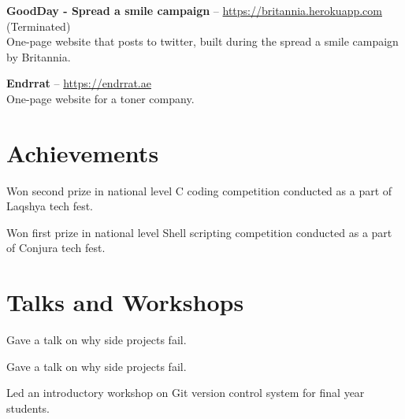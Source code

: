 \documentclass[11pt,a4paper]{moderncv}
\begin{document}
\vspace{5pt}

\cvlistitem
{\textbf{GoodDay - Spread a smile campaign} -- {\small \href{https://britannia.herokuapp.com}{https://britannia.herokuapp.com}} (Terminated)
  \\One-page website that posts to twitter, built during the spread a smile campaign by Britannia.
}

\vspace{5pt}

\cvlistitem
{\textbf{Endrrat} -- {\small \href{https://endrrat.ae}{https://endrrat.ae}}
  \\One-page website for a toner company.
}




\vspace{10pt}
\section{Achievements}

{Won second prize in national level C coding competition conducted as a part of Laqshya tech fest.}

{Won first prize in national level Shell scripting competition conducted as a part of Conjura tech fest.}




\vspace{10pt}
\section{Talks and Workshops}

{Gave a talk on why side projects fail.}

{Gave a talk on why side projects fail.}

{Led an introductory workshop on Git version control system for final year students.}


\end{document}
